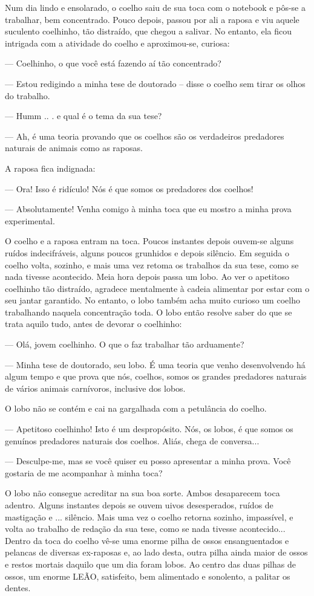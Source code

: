 Num dia lindo e ensolarado, o coelho saiu de sua toca com o notebook e pôs-se a trabalhar, bem concentrado. Pouco depois, passou por ali a raposa e viu aquele suculento coelhinho, tão distraído, que chegou a salivar. No entanto, ela ficou intrigada com a atividade do coelho e aproximou-se, curiosa:

--- Coelhinho, o que você está fazendo aí tão concentrado?

--- Estou redigindo a minha tese de doutorado -- disse o coelho sem tirar os olhos do trabalho.

--- Humm .. . e qual é o tema da sua tese?

--- Ah, é uma teoria provando que os coelhos são os verdadeiros predadores naturais de animais como as raposas.

A raposa fica indignada:

--- Ora! Isso é ridículo! Nós é que somos os predadores dos coelhos!

--- Absolutamente! Venha comigo à minha toca que eu mostro a minha prova experimental.

O coelho e a raposa entram na toca. Poucos instantes depois ouvem-se alguns ruídos indecifráveis, alguns poucos grunhidos e depois silêncio. Em seguida o coelho volta, sozinho, e mais uma vez retoma os trabalhos da sua tese, como se nada tivesse acontecido. Meia hora depois passa um lobo. Ao ver o apetitoso coelhinho tão distraído, agradece mentalmente à cadeia alimentar por estar com o seu jantar garantido. No entanto, o lobo também acha muito curioso um coelho trabalhando naquela concentração toda. O lobo então resolve saber do que se trata aquilo tudo, antes de devorar o coelhinho:

--- Olá, jovem coelhinho. O que o faz trabalhar tão arduamente?

--- Minha tese de doutorado, seu lobo. É uma teoria que venho desenvolvendo há algum tempo e que prova que nós, coelhos, somos os grandes predadores naturais de vários animais carnívoros, inclusive dos lobos.

O lobo não se contém e cai na gargalhada com a petulância do coelho.

--- Apetitoso coelhinho! Isto é um despropósito. Nós, os lobos, é que somos os genuínos predadores naturais dos coelhos. Aliás, chega de conversa...

--- Desculpe-me, mas se você quiser eu posso apresentar a minha prova. Você gostaria de me acompanhar à minha toca?

O lobo não consegue acreditar na sua boa sorte. Ambos desaparecem toca adentro. Alguns instantes depois se ouvem uivos desesperados, ruídos de mastigação e ... silêncio. Mais uma vez o coelho retorna sozinho, impassível, e volta ao trabalho de redação da sua tese, como se nada tivesse acontecido... Dentro da toca do coelho vê-se uma enorme pilha de ossos ensanguentados e pelancas de diversas ex-raposas e, ao lado desta, outra pilha ainda maior de ossos e restos mortais daquilo que um dia foram lobos. Ao centro das duas pilhas de ossos, um enorme LEÃO, satisfeito, bem alimentado e sonolento, a palitar os dentes.

